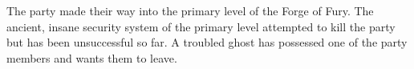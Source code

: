 The party made their way into the primary level of the Forge of Fury.
The ancient, insane security system of the primary level attempted to kill the party but has been unsuccessful so far.
A troubled ghost has possessed one of the party members and wants them to leave.
